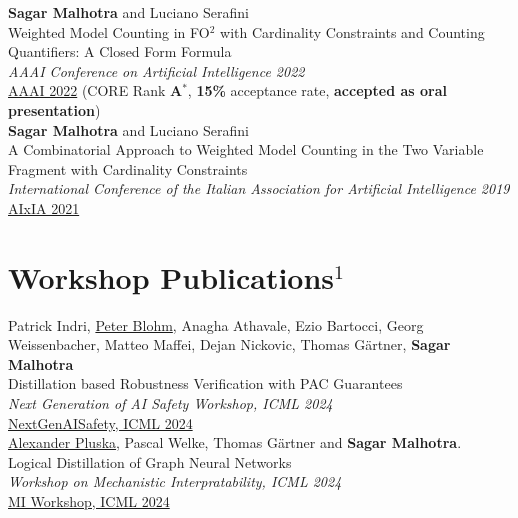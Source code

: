 \documentclass[10pt, a4paper]{article}
\newcommand{\years}[1]{\marginnote{\scriptsize #1}}
\begin{document}
\years{2022}\textbf{Sagar Malhotra} and Luciano Serafini\\ 
Weighted Model Counting in FO$^2$ with Cardinality Constraints and Counting Quantifiers: A Closed Form Formula \\ \emph{AAAI Conference on Artificial Intelligence 2022}\\
\href{https://ojs.aaai.org/index.php/AAAI/article/view/20525}{AAAI 2022} (CORE Rank \textbf{A$^{*}$}, \textbf{15\%} acceptance rate, \textbf{accepted as oral presentation}) \\

\years{2021}\textbf{Sagar Malhotra} and Luciano Serafini\\
 A Combinatorial Approach to Weighted Model Counting in the Two Variable Fragment with Cardinality Constraints\\ \emph{International Conference of the Italian Association for Artificial Intelligence 2019}\\
\href{https://link.springer.com/chapter/10.1007/978-3-031-08421-8_10}{AIxIA 2021}

\newpage

\section*{Workshop Publications$^{1}$}
\noindent

\years{2024} Patrick Indri, \underline{Peter Blohm}, Anagha Athavale, Ezio Bartocci, Georg Weissenbacher, Matteo Maffei, Dejan Nickovic, Thomas Gärtner, \textbf{Sagar Malhotra}\\
Distillation based Robustness Verification with PAC Guarantees\\
\emph{Next Generation of AI Safety Workshop, ICML 2024}\\
\href{https://openreview.net/forum?id=vflefS3lmB}{NextGenAISafety, ICML 2024}\\

\years{2024}\underline{Alexander Pluska}, Pascal Welke, Thomas G{\"a}rtner and \textbf{Sagar Malhotra}.\\
Logical Distillation of Graph Neural Networks\\
\emph{Workshop on Mechanistic Interpratability, ICML 2024}\\
\href{https://openreview.net/forum?id=TfYnD2gYRO}{MI Workshop, ICML 2024}\\ \\
\end{document}
